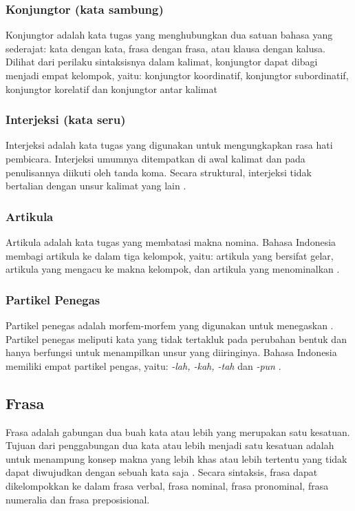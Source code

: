 \subsubsection{Konjungtor (kata sambung)}
Konjungtor adalah kata tugas yang menghubungkan dua satuan bahasa yang sederajat: kata dengan kata, frasa dengan frasa, atau klausa dengan kalusa. Dilihat dari perilaku sintaksisnya dalam kalimat, konjungtor dapat dibagi menjadi empat kelompok, yaitu: konjungtor koordinatif, konjungtor subordinatif, konjungtor korelatif dan konjungtor antar kalimat \citep{alwi}

\subsubsection{Interjeksi (kata seru)}
Interjeksi adalah kata tugas yang digunakan untuk mengungkapkan rasa hati pembicara. Interjeksi umumnya ditempatkan di awal kalimat dan pada penulisannya diikuti oleh tanda koma. Secara struktural, interjeksi tidak bertalian dengan unsur kalimat yang lain \citep{alwi}.

\subsubsection{Artikula}
Artikula adalah kata tugas yang membatasi makna nomina. Bahasa Indonesia membagi artikula ke dalam tiga kelompok, yaitu: artikula yang bersifat gelar, artikula yang mengacu ke makna kelompok, dan artikula yang menominalkan \citep{alwi}.

\subsubsection{Partikel Penegas}
Partikel penegas adalah morfem-morfem yang digunakan untuk menegaskan \citep{chaer}. Partikel penegas meliputi kata yang tidak tertakluk pada perubahan bentuk dan hanya berfungsi untuk menampilkan unsur yang diiringinya. Bahasa Indonesia memiliki empat partikel pengas, yaitu: \emph{-lah, -kah, -tah} dan \emph{-pun} \citep{alwi}.

\subsection{Frasa}
Frasa adalah gabungan dua buah kata atau lebih yang merupakan satu kesatuan. Tujuan dari penggabungan dua kata atau lebih menjadi satu kesatuan adalah untuk menampung konsep makna yang lebih khas atau lebih tertentu yang tidak dapat diwujudkan dengan sebuah kata saja \citep{chaer}. Secara sintaksis, frasa dapat dikelompokkan ke dalam frasa verbal, frasa nominal, frasa pronominal, frasa numeralia dan frasa preposisional. 

